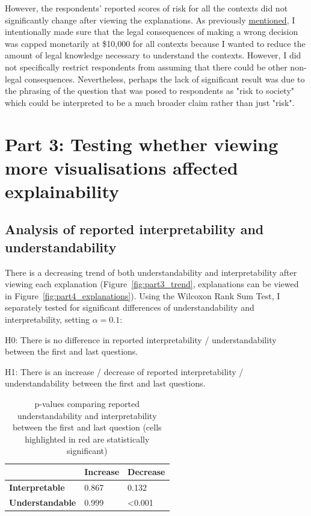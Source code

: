 However, the respondents' reported scores of risk for all the contexts did not significantly change after viewing the explanations. As previously \hyperref[sec:survey_method]{mentioned}, I intentionally made sure that the legal consequences of making a wrong decision was capped monetarily at \$10,000 for all contexts because I wanted to reduce the amount of legal knowledge necessary to understand the contexts. However, I did not specifically restrict respondents from assuming that there could be other non-legal consequences. Nevertheless, perhaps the lack of significant result was due to the phrasing of the question that was posed to respondents as "risk to society" which could be interpreted to be a much broader claim rather than just "risk".

\section{Part 3: Testing whether viewing more visualisations affected explainability}
\subsection{Analysis of reported interpretability and understandability}
\label{sec:interpret_understand}
There is a decreasing trend of both understandability and interpretability after viewing each explanation (Figure~\ref{fig:part3_trend}, explanations can be viewed in Figure~\ref{fig:part4_explanations}). Using the Wilcoxon Rank Sum Test, I separately tested for significant differences of understandability and interpretability, setting $\alpha = 0.1$: 

\noindent H0: There is no difference in reported interpretability / understandability between the first and last questions.

\noindent H1: There is an increase / decrease of reported interpretability / understandability between the first and last questions.

\begin{table}[!ht]
  \centering
  \begin{tabular}{l|l|l|}
  \cline{2-3}
                                                & \textbf{Increase} & \textbf{Decrease} \\ \hline
  \multicolumn{1}{|l|}{\textbf{Interpretable}} & 0.867             & 0.132             \\ \hline
  \multicolumn{1}{|l|}{\textbf{Understandable}}  & 0.999             & \cellcolor{red!25}\textless{}0.001  \\ \hline
  \end{tabular}
  \caption{p-values comparing reported understandability and interpretability between the first and last question (cells highlighted in red are statistically significant)}
  \label{tab:p_values_interpret_understand}
\end{table}

